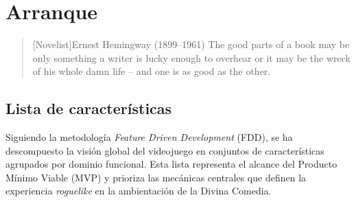 \chapter{Arranque}

\begin{quotation}[Novelist]{Ernest Hemingway (1899--1961)}
The good parts of a book may be only something a writer is lucky enough to overhear or it may be the wreck of his whole damn life -- and one is as good as the other.
\end{quotation}

\begin{abstract}
En este capítulo se formaliza el alcance del proyecto y se 
establecen las bases técnicas para su desarrollo. El objetivo es 
traducir la visión conceptual de Via Inferni en una lista estructurada de 
requisitos funcionales, aplicando una primera iteración de la metodología Feature 
Driven Development (FDD). Asimismo, se define la arquitectura de software que soportará
dichas funcionalidades, detallando los entornos de producción, las herramientas de 
diseño de datos (preproducción) y la estrategia de pruebas necesaria para asegurar 
la calidad del software.
\end{abstract}

\section{Lista de características}

Siguiendo la metodología \textit{Feature Driven Development} (FDD), 
se ha descompuesto la visión global del videojuego en conjuntos de características 
agrupados por dominio funcional. Esta lista representa el alcance del 
Producto Mínimo Viable (MVP) y prioriza las mecánicas 
centrales que definen la experiencia \textit{roguelike} en la ambientación de 
la Divina Comedia.

